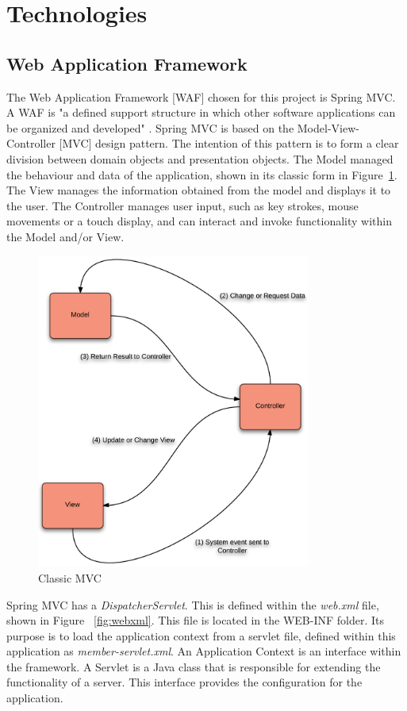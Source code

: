 \section{Technologies}

\subsection{Web Application Framework}
The Web Application Framework [WAF] chosen for this project is Spring MVC. A WAF is "a defined support structure in which other software applications can be organized and developed" \parencite{shan2006taxonomy}. Spring MVC is based on the Model-View-Controller [MVC] design pattern. The intention of this pattern is to form a clear division between domain objects and presentation objects. The Model managed the behaviour and data of the application, shown in its classic form in Figure~\ref{fig:mvcclassic}. The View manages the information obtained from the model and displays it to the user. The Controller manages user input, such as key strokes, mouse movements or a touch display, and can interact and invoke functionality within the Model and/or View.

\begin{figure}[H]
\begin{center}
\includegraphics[width=9cm]{mvcclassic.png}
\end{center}
\caption{Classic MVC}
\label{fig:mvcclassic}
\end{figure}

Spring MVC has a \textit{DispatcherServlet}. This is defined within the \textit{web.xml} file, shown in Figure ~\ref{fig:webxml}. This file is located in the WEB-INF folder. Its purpose is to load the application context from a servlet file, defined within this application as \textit{member-servlet.xml}. An Application Context is an interface within the framework. A Servlet is a Java class that is responsible for extending the functionality of a server. This interface provides the configuration for the application. 

